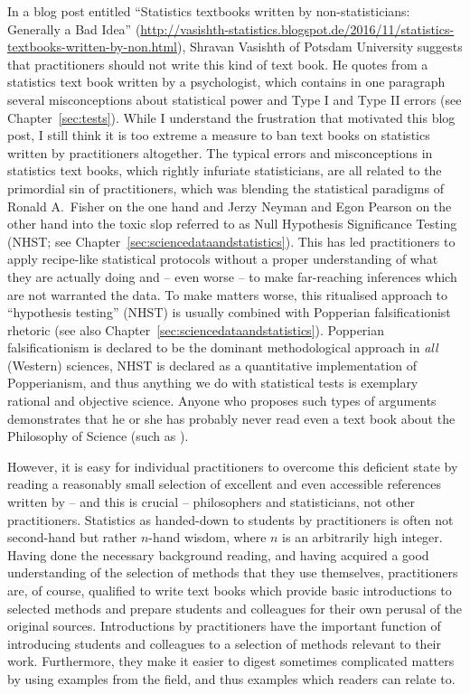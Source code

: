 In a blog post entitled ``Statistics textbooks written by non-statisticians: Generally a Bad Idea'' (\url{http://vasishth-statistics.blogspot.de/2016/11/statistics-textbooks-written-by-non.html}), Shravan Vasishth of Potsdam University suggests that practitioners should not write this kind of text book. 
He quotes from a statistics text book written by a psychologist, which contains in one paragraph several misconceptions about statistical power and Type I and Type II errors (see Chapter~\ref{sec:tests}).
While I understand the frustration that motivated this blog post, I still think it is too extreme a measure to ban text books on statistics written by practitioners altogether.
The typical errors and misconceptions in statistics text books, which rightly infuriate statisticians, are all related to the primordial sin of practitioners, which was blending the statistical paradigms of Ronald A.\ Fisher on the one hand and Jerzy Neyman and Egon Pearson on the other hand into the toxic slop referred to as Null Hypothesis Significance Testing (NHST; see Chapter~\ref{sec:sciencedataandstatistics}).
This has led practitioners to apply recipe-like statistical protocols without a proper understanding of what they are actually 
doing and -- even worse -- to make far-reaching inferences which are not warranted the data.
To make matters worse, this ritualised approach to ``hypothesis testing'' (NHST) is usually combined with Popperian falsificationist rhetoric (see also Chapter~\ref{sec:sciencedataandstatistics}).
Popperian falsificationism is declared to be the dominant methodological approach in \textit{all} (Western) sciences, NHST is declared as a quantitative implementation of Popperianism, and thus anything we do with statistical tests is exemplary rational and objective science.
Anyone who proposes such types of arguments demonstrates that he or she has probably never read even a text book about the Philosophy of Science (such as \citealt{Chalmers2013}).

However, it is easy for individual practitioners to overcome this deficient state by reading a reasonably small selection of excellent and even accessible references written by -- and this is crucial -- philosophers and statisticians, not other practitioners.
Statistics as handed-down to students by practitioners is often not second-hand but rather $n$-hand wisdom, where $n$ is an arbitrarily high integer.
Having done the necessary background reading, and having acquired a good understanding of the selection of methods that they use themselves, practitioners are, of course, qualified to write text books which provide basic introductions to selected methods and prepare students and colleagues for their own perusal of the original sources.
Introductions by practitioners have the important function of introducing students and colleagues to a selection of methods relevant to their work.
Furthermore, they make it easier to digest sometimes complicated matters by using examples from the field, and thus examples which readers can relate to.

